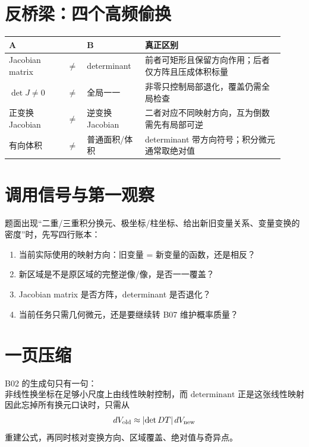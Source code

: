 \documentclass[profile=standard]{ipara-handbook}
\begin{document}
\section{反桥梁：四个高频偷换}
\begin{tabular}{p{0.20\linewidth}p{0.04\linewidth}p{0.20\linewidth}p{0.48\linewidth}}
\hline
A & & B & 真正区别\\
\hline
Jacobian matrix & $\neq$ & determinant & 前者可矩形且保留方向作用；后者仅方阵且压成体积标量\\
$\det J\neq0$ & $\neq$ & 全局一一 & 非零只控制局部退化，覆盖仍需全局检查\\
正变换 Jacobian & $\neq$ & 逆变换 Jacobian & 二者对应不同映射方向，互为倒数需先有局部可逆\\
有向体积 & $\neq$ & 普通面积/体积 & determinant 带方向符号；积分微元通常取绝对值\\
\hline
\end{tabular}

\section{调用信号与第一观察}
题面出现“二重/三重积分换元、极坐标/柱坐标、给出新旧变量关系、变量变换的密度”时，先写四行账本：
\begin{enumerate}
\item 当前实际使用的映射方向：旧变量 = 新变量的函数，还是相反？
\item 新区域是不是原区域的完整逆像/像，是否一一覆盖？
\item Jacobian matrix 是否方阵，determinant 是否退化？
\item 当前任务只需几何微元，还是要继续转 B07 维护概率质量？
\end{enumerate}

\section{一页压缩}
B02 的生成句只有一句：
\[
\boxed{\text{非线性换坐标在足够小尺度上由线性映射控制，而 determinant 正是这张线性映射的满维体积倍率。}}
\]
因此忘掉所有换元口诀时，只需从
\[
dV_{\rm old}\approx\lvert\det DT\rvert\,dV_{\rm new}
\]
重建公式，再同时核对变换方向、区域覆盖、绝对值与奇异点。
\end{document}
